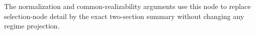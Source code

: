 The normalization and common-realizability arguments use this node to replace selection-node detail by the exact two-section summary without changing any regime projection.